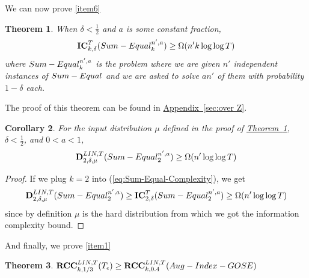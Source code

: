 \documentclass[11pt]{article}
\numberwithin{equation}{section}
\newtheorem{theorem}{Theorem}[section]
\newtheorem{corollary}[theorem]{Corollary}
\theoremstyle{definition}
\theoremstyle{plain}
\newcommand{\expref}[2]{\hyperref[#2]{#1~\ref{#2}}}
\newcommand{\ic}{\ensuremath{\mathbf{IC}}}
\newcommand{\rcclinT}{\ensuremath{\mathbf{RCC}^{LIN,T}}}
\newcommand{\DlinT}{\ensuremath{\mathbf{D}^{LIN,T}}}
\newcommand{\sumequal}{\textsc{Sum-Equal} }
\newcommand{\auggo}{\textsc{Aug-Index-GOSE}}
\begin{document}
%
{\color{black} We can now prove \ref{item6}}

\begin{theorem}
When $\delta < \frac{1}{2}$ and $a$ is some constant fraction,
\begin{equation}
    \ic^T_{k,\delta}(\sumequal_k^{n',a}) \ge \Omega(n'k \log \log T)
    \label{eq:Sum-Equal-Complexity}
\end{equation}
where $\sumequal_k^{n',a}$ is the problem where we are given $n'$ independent instances of $\sumequal$ and we are asked to solve $an'$ of them with probability $1-\delta$ each.
\label{thm:woodruff}
\end{theorem}
The proof of this theorem can be found in \expref{Appendix}{sec:over Z}.

\begin{corollary}
For the input distribution $\mu$ defined in the proof of \expref{Theorem}{thm:woodruff}, $\delta < \frac{1}{2}$, and $0<a<1$,
$$\DlinT_{2,\delta,\mu}(\sumequal_2^{n',a}) \ge \Omega(n' \log \log T)$$
\end{corollary}
\begin{proof}
If we plug $k=2$ into (\ref{eq:Sum-Equal-Complexity}), we get
$$\DlinT_{2,\delta,\mu}(\sumequal_2^{n',a}) \ge \ic^T_{2,\delta}(\sumequal_2^{n',a}) \ge \Omega(n' \log \log T)$$
since by definition $\mu$ is the hard distribution
%
{}from which we got the information complexity bound.  %
\end{proof}

%
{\color{black} And finally, we prove \ref{item1}}

\begin{theorem}
$\rcclinT_{k,1/3}(T_\epsilon) \ge \rcclinT_{k,0.4}(\auggo)$
\end{theorem}
\end{document}
